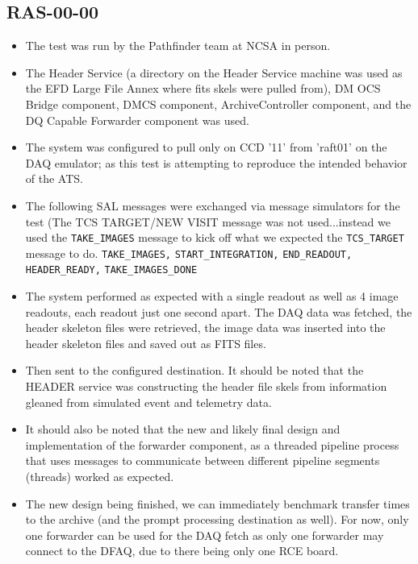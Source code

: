 \documentclass[DM,lsstdraft,STR,toc]{lsstdoc}
\begin{document}
\subsection{RAS-00-00}
\label{sect:detail-RAS-00-00}
\begin{itemize}

  \item{

The test was run by the Pathfinder team at NCSA in person.   
}

  \item{
The Header Service (a directory on the Header Service machine was used as the EFD Large File Annex where fits skels were pulled from), DM OCS Bridge component, DMCS component, ArchiveController component, and the DQ Capable Forwarder component was used. 
}
 \item{
The system was configured to pull only on CCD '11' from 'raft01' on the DAQ emulator; as this test is attempting to reproduce the intended behavior of the ATS.
}
 \item{
The following SAL messages were exchanged via message simulators for the test (The TCS TARGET/NEW VISIT message was not used...instead we used the \texttt{TAKE{\_}IMAGES} message to kick off what we expected the \texttt{TCS{\_}TARGET} message to do.
\texttt{TAKE{\_}IMAGES,}
\texttt{START{\_}INTEGRATION,}
\texttt{END{\_}READOUT,}
\texttt{HEADER{\_}READY,}
\texttt{TAKE{\_}IMAGES{\_}DONE}
}
 \item{
The system performed as expected with a single readout as well as 4 image readouts, each readout just one second apart. 
The DAQ data was fetched, the header skeleton files were retrieved, the image data was inserted into the header skeleton files and saved out as FITS files. 
}
 \item{
Then sent to the configured destination. 
It should be noted that the HEADER service was constructing the header file skels from information gleaned from simulated event and telemetry data. 
}
 \item{
It should also be noted that the new and likely final design and implementation of the forwarder component, as a threaded pipeline process that uses messages to communicate between different pipeline segments (threads) worked as expected. 
}
 \item{
The new design being finished, we can immediately benchmark transfer times to the archive (and the prompt processing destination as well). For now, only one forwarder can be used for the DAQ fetch as only one forwarder may connect to the DFAQ, due to there being only one RCE board. 
}
\end{itemize}
\end{document}
